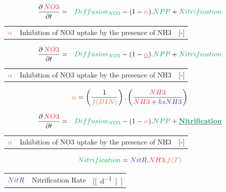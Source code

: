\documentclass[final,xcolor=dvipsnames]{beamer}
\begin{document}
      
      \begin{frame}   
	\begin{exampleblock}{}
	  \begin{eqnarray*}
	    \small
	    \frac{\partial\,\varC[NO3]}{\partial t} & = & \proC[Diffusion_{NO3}] - (1-\worC[\alpha]).\proC[NPP] + \proC[Nitrification]
	  \end{eqnarray*}
	  \begin{tabular}{ l l l }
	    $\worC[\alpha]$ & Inhibition of NO3 uptake by the presence of NH3 & [-]
	  \end{tabular}
	\end{exampleblock}
      \end{frame} 

      
      \begin{frame}   
	\begin{exampleblock}{}
	  \begin{eqnarray*}
	    \small
	    \frac{\partial\,\varC[NO3]}{\partial t} & = & \proC[Diffusion_{NO3}] - (1-\underline{\mathbf{\worC[\alpha]}}).\proC[NPP] + \proC[Nitrification]
	  \end{eqnarray*}
	  \begin{tabular}{ l l l }
	    $\worC[\alpha]$ & Inhibition of NO3 uptake by the presence of NH3 & [-]
	  \end{tabular}
	\end{exampleblock}
	\begin{exampleblock}{\extitle[$\alpha$]}
	  \begin{equation*}
	    \worC[\alpha] =  \left( \frac{1}{\worC[f(DIN)]}\right) .  \left( \frac{\varC[NH3]}{\varC[NH3]+\parC[ksNH3]   }\right) 
	  \end{equation*}
	    \end{exampleblock}
      \end{frame} 

      \begin{frame}   
	\begin{exampleblock}{}
	  \begin{eqnarray*}
	    \small
	    \frac{\partial\,\varC[NO3]}{\partial t} & = & \proC[Diffusion_{NO3}] - (1-\worC[\alpha]).\proC[NPP] + \underline{\mathbf{\proC[Nitrification]}}
	  \end{eqnarray*}
	  \begin{tabular}{ l l l }
	    $\worC[\alpha]$ & Inhibition of NO3 uptake by the presence of NH3 & [-]
	  \end{tabular}
	\end{exampleblock}
	\begin{exampleblock}{\extitle[$Nitrification$]}
	  \begin{equation*}
	    \proC[Nitrification] = \parC[NitR] . \varC[NH3] . \worC[f(T)]
	  \end{equation*}
	  \begin{tabular}{ l l l }
	    $\parC[NitR]$ & Nitrification Rate &  [\unit[d^{-1}]] 
	  \end{tabular}
	    \end{exampleblock}
      \end{frame} 
\end{document}
